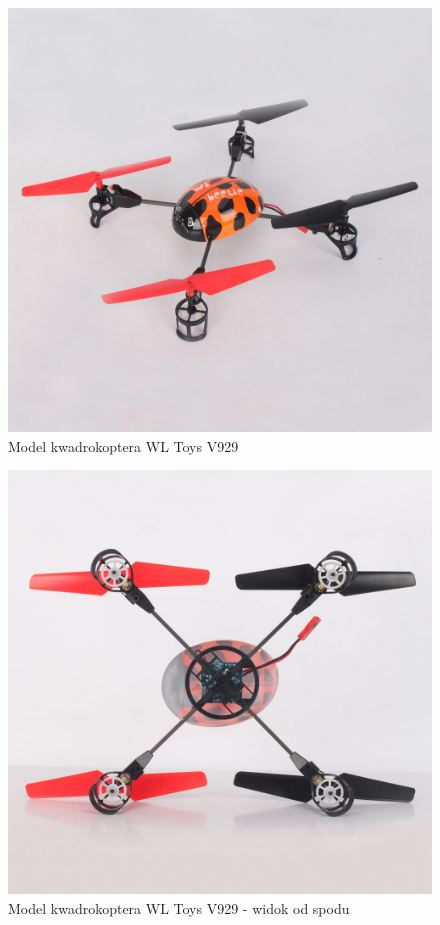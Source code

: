\begin{figure}[H]
	\centering
	\includegraphics[scale=0.3]{Pictures/Quadro_beetle2.jpg}
		\caption[Model kwadrokoptera WL Toys V929]{Model kwadrokoptera WL Toys V929}
	\label{fig:Quadro_beetle2}
\end{figure}

\begin{figure}[H]
	\centering
	\includegraphics[scale=0.3]{Pictures/Quadro_beetle3.jpg}
		\caption[Model kwadrokoptera WL Toys V929 - widok od spodu]{Model kwadrokoptera WL Toys V929 - widok od spodu}
	\label{fig:Quadro_beetle3}
\end{figure}

